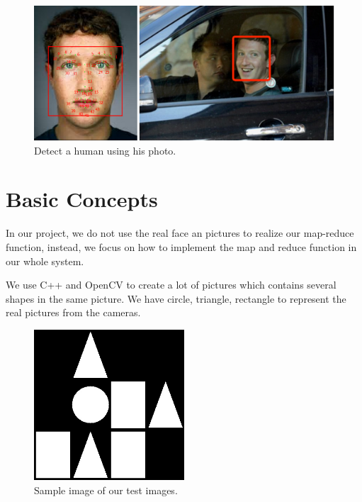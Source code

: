 \documentclass[12pt]{article}
\begin{document}
\begin{figure}[h!]
  
  \centering
    \includegraphics[width=1\textwidth]{2.png}
    \caption{Detect a human using his photo.}
\end{figure}



\section {Basic Concepts}

In our project, we do not use the real face an pictures to realize our map-reduce function, instead, we focus on how to implement the map and reduce function in our whole system.

We use C++ and OpenCV to create a lot of pictures which contains several shapes in the same picture. We have circle, triangle, rectangle to represent the real pictures from the cameras. 

\begin{figure}[h!]
  
  \centering
    \includegraphics[width=0.5\textwidth]{1.jpg}
    \caption{Sample image of our test images.}
\end{figure}
\end{document}

